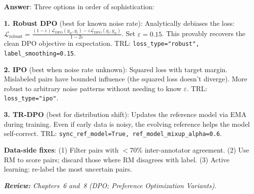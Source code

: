 \begin{questionbox}
\textbf{Answer}: Three options in order of sophistication:

\textbf{1. Robust DPO} (best for known noise rate): Analytically debiases the loss: $\mathcal{L}_\text{robust} = \frac{(1-\varepsilon)\mathcal{L}_\text{DPO}(y_w, y_l) - \varepsilon \mathcal{L}_\text{DPO}(y_l, y_w)}{1 - 2\varepsilon}$. Set $\varepsilon = 0.15$. This provably recovers the clean DPO objective in expectation. TRL: \texttt{loss\_type="robust", label\_smoothing=0.15}.

\textbf{2. IPO} (best when noise rate unknown): Squared loss with target margin. Mislabeled pairs have bounded influence (the squared loss doesn’t diverge). More robust to arbitrary noise patterns without needing to know $\varepsilon$. TRL: \texttt{loss\_type="ipo"}.

\textbf{3. TR-DPO} (best for distribution shift): Updates the reference model via EMA during training. Even if early data is noisy, the evolving reference helps the model self-correct. TRL: \texttt{sync\_ref\_model=True, ref\_model\_mixup\_alpha=0.6}.

\textbf{Data-side fixes}: (1) Filter pairs with $<$70\% inter-annotator agreement. (2) Use RM to score pairs; discard those where RM disagrees with label. (3) Active learning: re-label the most uncertain pairs.

\emph{\textbf{Review:} Chapters~6 and~8 (DPO; Preference Optimization Variants).}
\end{questionbox}

